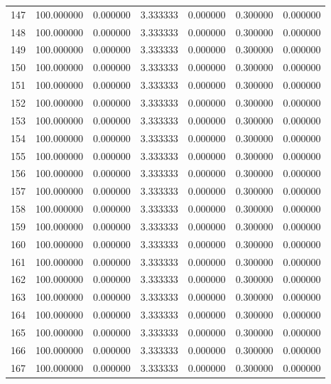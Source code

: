 \begin{tabular}{rrrrrrr}
147 & 100.000000 &    0.000000 &  3.333333 &    0.000000 &    0.300000 &  0.000000 \\
148 & 100.000000 &    0.000000 &  3.333333 &    0.000000 &    0.300000 &  0.000000 \\
149 & 100.000000 &    0.000000 &  3.333333 &    0.000000 &    0.300000 &  0.000000 \\
150 & 100.000000 &    0.000000 &  3.333333 &    0.000000 &    0.300000 &  0.000000 \\
151 & 100.000000 &    0.000000 &  3.333333 &    0.000000 &    0.300000 &  0.000000 \\
152 & 100.000000 &    0.000000 &  3.333333 &    0.000000 &    0.300000 &  0.000000 \\
153 & 100.000000 &    0.000000 &  3.333333 &    0.000000 &    0.300000 &  0.000000 \\
154 & 100.000000 &    0.000000 &  3.333333 &    0.000000 &    0.300000 &  0.000000 \\
155 & 100.000000 &    0.000000 &  3.333333 &    0.000000 &    0.300000 &  0.000000 \\
156 & 100.000000 &    0.000000 &  3.333333 &    0.000000 &    0.300000 &  0.000000 \\
157 & 100.000000 &    0.000000 &  3.333333 &    0.000000 &    0.300000 &  0.000000 \\
158 & 100.000000 &    0.000000 &  3.333333 &    0.000000 &    0.300000 &  0.000000 \\
159 & 100.000000 &    0.000000 &  3.333333 &    0.000000 &    0.300000 &  0.000000 \\
160 & 100.000000 &    0.000000 &  3.333333 &    0.000000 &    0.300000 &  0.000000 \\
161 & 100.000000 &    0.000000 &  3.333333 &    0.000000 &    0.300000 &  0.000000 \\
162 & 100.000000 &    0.000000 &  3.333333 &    0.000000 &    0.300000 &  0.000000 \\
163 & 100.000000 &    0.000000 &  3.333333 &    0.000000 &    0.300000 &  0.000000 \\
164 & 100.000000 &    0.000000 &  3.333333 &    0.000000 &    0.300000 &  0.000000 \\
165 & 100.000000 &    0.000000 &  3.333333 &    0.000000 &    0.300000 &  0.000000 \\
166 & 100.000000 &    0.000000 &  3.333333 &    0.000000 &    0.300000 &  0.000000 \\
167 & 100.000000 &    0.000000 &  3.333333 &    0.000000 &    0.300000 &  0.000000 \\

\end{tabular}
